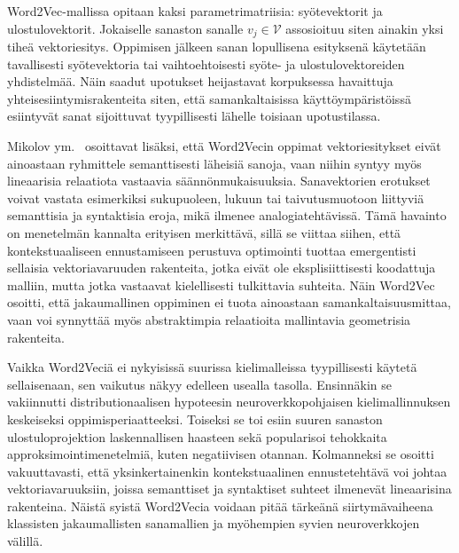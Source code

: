Word2Vec-mallissa opitaan kaksi parametrimatriisia: syötevektorit ja
ulostulovektorit. Jokaiselle sanaston sanalle \(v_j \in \mathcal{V}\) assosioituu siten
ainakin yksi tiheä vektoriesitys. Oppimisen jälkeen sanan lopullisena
esityksenä käytetään tavallisesti syötevektoria tai vaihtoehtoisesti syöte- ja
ulostulovektoreiden yhdistelmää. Näin saadut upotukset heijastavat korpuksessa
havaittuja yhteisesiintymisrakenteita siten, että samankaltaisissa
käyttöympäristöissä esiintyvät sanat sijoittuvat tyypillisesti lähelle toisiaan
upotustilassa.

Mikolov ym.\ \cite{mikolov2013efficient} osoittavat lisäksi, että Word2Vecin
oppimat vektoriesitykset eivät ainoastaan ryhmittele semanttisesti läheisiä
sanoja, vaan niihin syntyy myös lineaarisia relaatiota vastaavia
säännönmukaisuuksia. Sanavektorien erotukset voivat vastata esimerkiksi
sukupuoleen, lukuun tai taivutusmuotoon liittyviä semanttisia ja syntaktisia
eroja, mikä ilmenee analogiatehtävissä. Tämä havainto on menetelmän kannalta
erityisen merkittävä, sillä se viittaa siihen, että kontekstuaaliseen
ennustamiseen perustuva optimointi tuottaa emergentisti sellaisia
vektoriavaruuden rakenteita, jotka eivät ole eksplisiittisesti koodattuja
malliin, mutta jotka vastaavat kielellisesti tulkittavia suhteita. Näin
Word2Vec osoitti, että jakaumallinen oppiminen ei tuota ainoastaan
samankaltaisuusmittaa, vaan voi synnyttää myös abstraktimpia relaatioita
mallintavia geometrisia rakenteita.

Vaikka Word2Veciä ei nykyisissä suurissa kielimalleissa tyypillisesti käytetä
sellaisenaan, sen vaikutus näkyy edelleen usealla
tasolla. Ensinnäkin se vakiinnutti distributionaalisen hypoteesin
neuroverkkopohjaisen kielimallinnuksen keskeiseksi oppimisperiaatteeksi.
Toiseksi se toi esiin suuren sanaston ulostuloprojektion laskennallisen
haasteen sekä popularisoi tehokkaita approksimointimenetelmiä, kuten
negatiivisen otannan. Kolmanneksi se osoitti vakuuttavasti, että
yksinkertainenkin kontekstuaalinen ennustetehtävä voi johtaa
vektoriavaruuksiin, joissa semanttiset ja syntaktiset suhteet ilmenevät
lineaarisina rakenteina. Näistä syistä Word2Vecia voidaan pitää tärkeänä
siirtymävaiheena klassisten jakaumallisten sanamallien ja myöhempien
syvien neuroverkkojen välillä.
